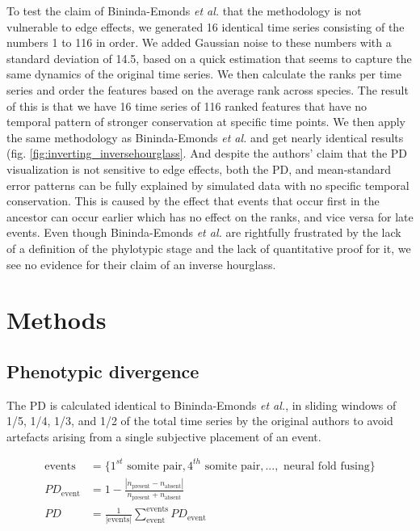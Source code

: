To test the claim of Bininda-Emonds \textit{et al.} that the methodology is not vulnerable to edge effects, we generated 16 identical time series consisting of the numbers 1 to 116 in order. We added Gaussian noise to these numbers with a standard deviation of 14.5, based on a quick estimation that seems to capture the same dynamics of the original time series. We then calculate the ranks per time series and order the features based on the average rank across species. The result of this is that we have 16 time series of 116 ranked features that have no temporal pattern of stronger conservation at specific time points. We then apply the same methodology as Bininda-Emonds \textit{et al.} and get nearly identical results (fig. \ref{fig:inverting_inversehourglass}. And despite the authors' claim that the PD visualization is not sensitive to edge effects, both the PD, and mean-standard error patterns can be fully explained by simulated data with no specific temporal conservation. This is caused by the effect that events that occur first in the ancestor can occur earlier which has no effect on the ranks, and vice versa for late events. Even though Bininda-Emonds \textit{et al.} are rightfully frustrated by the lack of a definition of the phylotypic stage and the lack of quantitative proof for it, we see no evidence for their claim of an inverse hourglass. 

\newpage
\section{Methods}

\subsection{Phenotypic divergence}

The PD is calculated identical to Bininda-Emonds \textit{et al.},  in sliding windows of 1/5, 1/4, 1/3, and 1/2 of the total time series by the original authors to avoid artefacts arising from a single subjective placement of an event. 

\begin{align*}\label{eq:phenotypicdivergence}
    \text{events} &= \{1^{st}\text{ somite pair}, 4^{th}\text{ somite pair}, ...,\text{ neural fold fusing}\} \\ 
    PD_{\text{event}} &= 1 - \frac{|n_{\text{present}} - n_{\text{absent}}|}{n_{\text{present}} + n_{\text{absent}}} \\
    PD &= \frac{1}{|\text{events}|} \sum_{\text{event}}^{\text{events}} PD_{\text{event}}
\end{align*}

